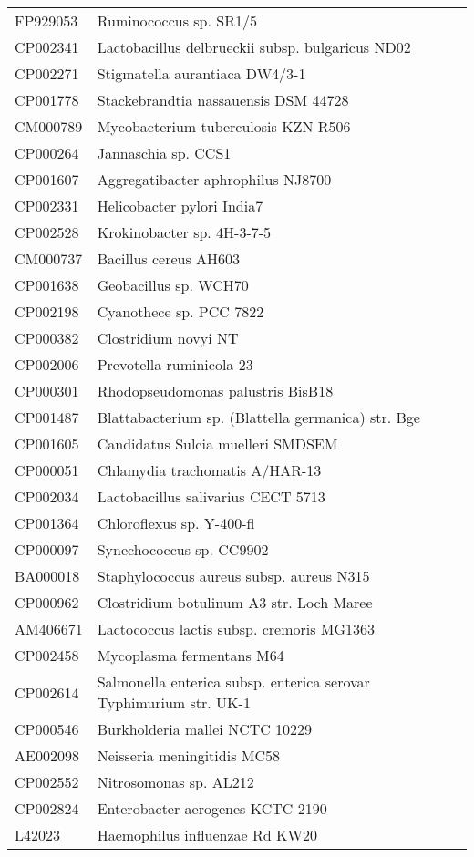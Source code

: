 \begin{longtable}{ll}
FP929053 & Ruminococcus sp. SR1/5\\
CP002341 & Lactobacillus delbrueckii subsp. bulgaricus ND02\\
CP002271 & Stigmatella aurantiaca DW4/3-1\\
CP001778 & Stackebrandtia nassauensis DSM 44728\\
CM000789 & Mycobacterium tuberculosis KZN R506\\
CP000264 & Jannaschia sp. CCS1\\
CP001607 & Aggregatibacter aphrophilus NJ8700\\
CP002331 & Helicobacter pylori India7\\
CP002528 & Krokinobacter sp. 4H-3-7-5\\
CM000737 & Bacillus cereus AH603\\
CP001638 & Geobacillus sp. WCH70\\
CP002198 & Cyanothece sp. PCC 7822\\
CP000382 & Clostridium novyi NT\\
CP002006 & Prevotella ruminicola 23\\
CP000301 & Rhodopseudomonas palustris BisB18\\
CP001487 & Blattabacterium sp. (Blattella germanica) str. Bge\\
CP001605 & Candidatus Sulcia muelleri SMDSEM\\
CP000051 & Chlamydia trachomatis A/HAR-13\\
CP002034 & Lactobacillus salivarius CECT 5713\\
CP001364 & Chloroflexus sp. Y-400-fl\\
CP000097 & Synechococcus sp. CC9902\\
BA000018 & Staphylococcus aureus subsp. aureus N315\\
CP000962 & Clostridium botulinum A3 str. Loch Maree\\
AM406671 & Lactococcus lactis subsp. cremoris MG1363\\
CP002458 & Mycoplasma fermentans M64\\
CP002614 & Salmonella enterica subsp. enterica serovar Typhimurium str. UK-1\\
CP000546 & Burkholderia mallei NCTC 10229\\
AE002098 & Neisseria meningitidis MC58\\
CP002552 & Nitrosomonas sp. AL212\\
CP002824 & Enterobacter aerogenes KCTC 2190\\
L42023 & Haemophilus influenzae Rd KW20\\

\end{longtable}
